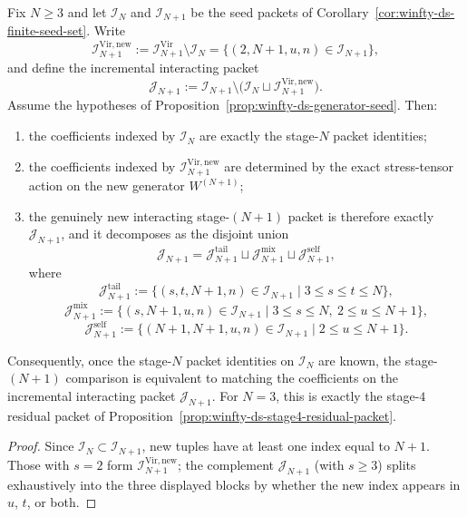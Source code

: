\begin{proposition}
\label{prop:winfty-ds-stage-growth-packet}
\ClaimStatusConditional
Fix $N \ge 3$ and let $\mathcal{I}_N$ and $\mathcal{I}_{N+1}$ be the
seed packets of Corollary~\ref{cor:winfty-ds-finite-seed-set}. Write
\[
\mathcal{I}_{N+1}^{\mathrm{Vir,new}}
:=
\mathcal{I}_{N+1}^{\mathrm{Vir}}\setminus \mathcal{I}_N
=
\{(2,N{+}1,u,n)\in \mathcal{I}_{N+1}\},
\]
and define the incremental interacting packet
\[
\mathcal{J}_{N+1}
:=
\mathcal{I}_{N+1}\setminus
\bigl(\mathcal{I}_N\sqcup \mathcal{I}_{N+1}^{\mathrm{Vir,new}}\bigr).
\]
Assume the hypotheses of
Proposition~\ref{prop:winfty-ds-generator-seed}. Then:
\begin{enumerate}
\item the coefficients indexed by $\mathcal{I}_N$ are exactly the
 stage-$N$ packet identities;
\item the coefficients indexed by
 $\mathcal{I}_{N+1}^{\mathrm{Vir,new}}$ are determined by the exact
 stress-tensor action on the new generator $W^{(N+1)}$;
\item the genuinely new interacting stage-$(N+1)$ packet is therefore
 exactly $\mathcal{J}_{N+1}$, and it decomposes as the disjoint union
 \[
 \mathcal{J}_{N+1}
 =
 \mathcal{J}_{N+1}^{\mathrm{tail}}
 \sqcup
 \mathcal{J}_{N+1}^{\mathrm{mix}}
 \sqcup
 \mathcal{J}_{N+1}^{\mathrm{self}},
 \]
 where
 \[
 \mathcal{J}_{N+1}^{\mathrm{tail}}
 :=
 \{(s,t,N{+}1,n)\in\mathcal{I}_{N+1}\mid 3\le s\le t\le N\},
 \]
 \[
 \mathcal{J}_{N+1}^{\mathrm{mix}}
 :=
 \{(s,N{+}1,u,n)\in\mathcal{I}_{N+1}\mid 3\le s\le N,\ 2\le u\le N{+}1\},
 \]
 \[
 \mathcal{J}_{N+1}^{\mathrm{self}}
 :=
 \{(N{+}1,N{+}1,u,n)\in\mathcal{I}_{N+1}\mid 2\le u\le N{+}1\}.
 \]
\end{enumerate}
Consequently, once the stage-$N$ packet identities on $\mathcal{I}_N$
are known, the stage-$(N+1)$ comparison is equivalent to matching the
coefficients on the incremental interacting packet $\mathcal{J}_{N+1}$.
For $N=3$, this is exactly the stage-$4$ residual packet of
Proposition~\ref{prop:winfty-ds-stage4-residual-packet}.
\end{proposition}

\begin{proof}
Since $\mathcal{I}_N\subset \mathcal{I}_{N+1}$, new tuples have at least one index equal to $N{+}1$. Those with $s=2$ form $\mathcal{I}_{N+1}^{\mathrm{Vir,new}}$; the complement $\mathcal{J}_{N+1}$ (with $s\geq 3$) splits exhaustively into the three displayed blocks by whether the new index appears in $u$, $t$, or both.
\end{proof}

